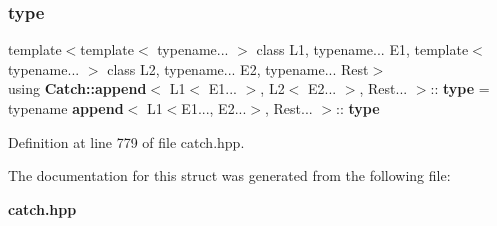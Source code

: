 \subsubsection{type}
{\footnotesize\ttfamily template$<$template$<$ typename... $>$ class L1, typename... E1, template$<$ typename... $>$ class L2, typename... E2, typename... Rest$>$ \\
using \textbf{ Catch\+::append}$<$ L1$<$ E1... $>$, L2$<$ E2... $>$, Rest... $>$\+::\textbf{ type} =  typename \textbf{ append}$<$ L1$<$E1..., E2...$>$, Rest... $>$\+::\textbf{ type}}



Definition at line 779 of file catch.\+hpp.



The documentation for this struct was generated from the following file\+:\begin{DoxyCompactItemize}
\item 
\textbf{ catch.\+hpp}\end{DoxyCompactItemize}
